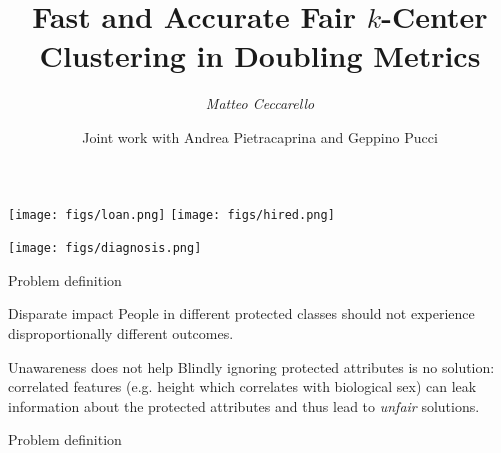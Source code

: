 \documentclass{beamer}
\title{Fast and Accurate Fair $k$-Center Clustering in Doubling Metrics}
\author{\emph{Matteo Ceccarello}}
\institute{U. of Padova}
\date{Joint work with Andrea Pietracaprina and Geppino Pucci}
\begin{document}
\frame{\titlepage}

%


\begin{frame}{}
	\centering

  \texttt{[image: figs/loan.png]}
  \texttt{[image: figs/hired.png]}

  \texttt{[image: figs/diagnosis.png]}

\end{frame}

\begin{frame}{Problem definition}
	\begin{block}{Disparate impact}
    People in different protected
		classes should not experience disproportionally different outcomes.
	\end{block}

	\pause

	\begin{block}{Unawareness does not help}
		Blindly ignoring protected attributes
		is no solution: correlated features (e.g. height which correlates with
		biological sex) can leak information about the protected attributes and thus lead to
		\emph{unfair} solutions.
	\end{block}
\end{frame}

\begin{frame}{Problem definition}
	\centering


\end{frame}
\end{document}
